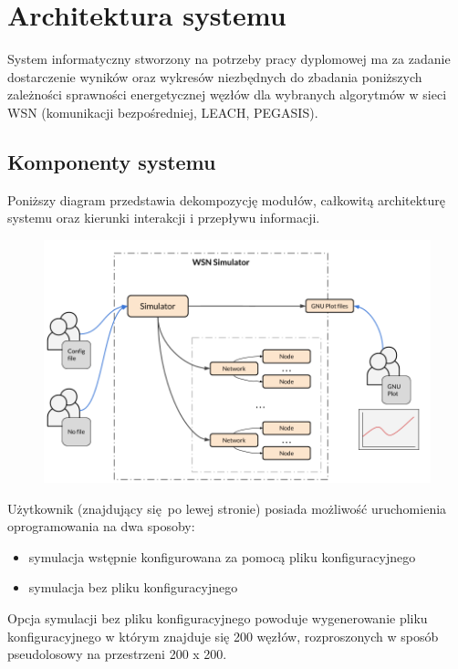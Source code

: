 \documentclass[a4paper,12pt,twoside,openany]{report}
\begin{document}
\chapter{Architektura systemu}

System informatyczny stworzony na potrzeby pracy dyplomowej ma za zadanie dostarczenie wyników oraz wykresów niezbędnych do zbadania poniższych zależności sprawności energetycznej 
węzłów dla wybranych algorytmów w sieci WSN (komunikacji bezpośredniej, LEACH, PEGASIS). 

\section{Komponenty systemu}

Poniższy diagram przedstawia dekompozycję modułów, całkowitą architekturę systemu oraz kierunki interakcji i przepływu informacji.

\begin{figure}[H]
 \centering
 \includegraphics[width=13cm]{images/architektura_systemu.png} 
\end{figure}

Użytkownik (znajdujący się po lewej stronie) posiada możliwość uruchomienia oprogramowania na dwa sposoby: 

\begin{itemize}
 \item symulacja wstępnie konfigurowana za pomocą pliku konfiguracyjnego
 \item symulacja bez pliku konfiguracyjnego
\end{itemize}

Opcja symulacji bez pliku konfiguracyjnego powoduje wygenerowanie pliku konfiguracyjnego w którym znajduje się 200 węzłów, rozproszonych w sposób
pseudolosowy na przestrzeni 200 x 200.
\end{document}
